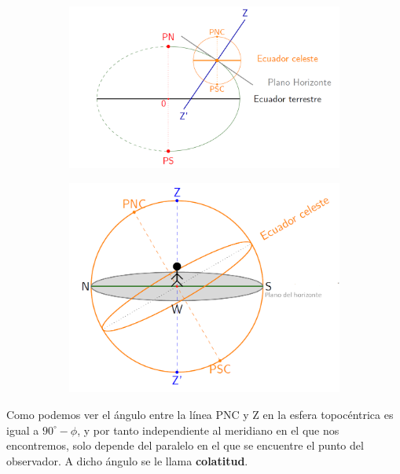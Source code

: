 \begin{figure}[h]
	\centering
	\begin{subfigure}{0.55\textwidth}
		\centering
		\includegraphics[width=1\textwidth]{Cuerpo/Imagenes/01_Plano.png}
	\end{subfigure}
	\hfill
	\begin{subfigure}{0.4\textwidth}
		\centering
		\includegraphics[width=1\textwidth]{Cuerpo/Imagenes/01_Esfera.png}
	\end{subfigure}
\end{figure}
Como podemos ver el ángulo entre la línea PNC y Z en la esfera topocéntrica es igual a $90^\circ - \phi$, y por tanto independiente al meridiano en el que nos encontremos, solo depende del paralelo en el que se encuentre el punto del observador. A dicho ángulo se le llama \textbf{colatitud}.


